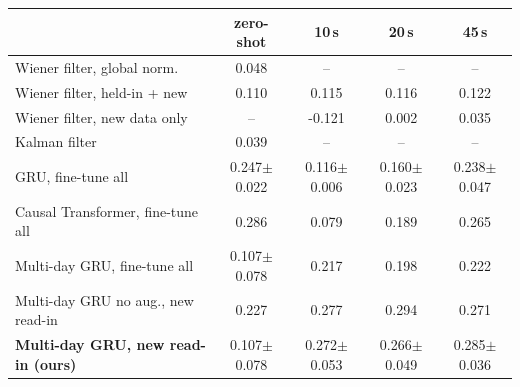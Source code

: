 \begin{tabular}{l c ccc}
\toprule
& zero-shot & 10\,s & 20\,s & 45\,s \\
\midrule
Wiener filter, global norm. & 0.048 & -- & -- & -- \\
Wiener filter, held-in + new & 0.110 & 0.115 & 0.116 & 0.122 \\
Wiener filter, new data only & -- & -0.121 & 0.002 & 0.035 \\
Kalman filter & 0.039 & -- & -- & -- \\
GRU, fine-tune all & 0.247{\scriptsize$\pm$0.022} & 0.116{\scriptsize$\pm$0.006} & 0.160{\scriptsize$\pm$0.023} & 0.238{\scriptsize$\pm$0.047} \\
Causal Transformer, fine-tune all & 0.286 & 0.079 & 0.189 & 0.265 \\
Multi-day GRU, fine-tune all & 0.107{\scriptsize$\pm$0.078} & 0.217 & 0.198 & 0.222 \\
Multi-day GRU no aug., new read-in & 0.227 & 0.277 & 0.294 & 0.271 \\
\textbf{Multi-day GRU, new read-in (ours)} & 0.107{\scriptsize$\pm$0.078} & 0.272{\scriptsize$\pm$0.053} & 0.266{\scriptsize$\pm$0.049} & 0.285{\scriptsize$\pm$0.036} \\
\bottomrule
\end{tabular}

